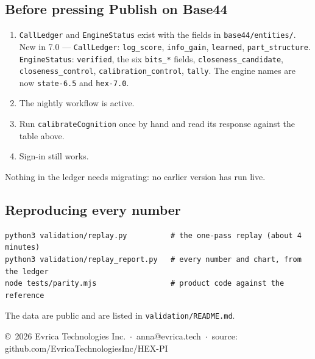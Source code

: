 \documentclass[10.5pt]{article}
\begin{document}
\subsection*{Before pressing Publish on Base44}
\begin{enumerate}[leftmargin=1.4em,itemsep=1pt]
\item \texttt{CallLedger} and \texttt{EngineStatus} exist with the fields in \texttt{base44/entities/}. New in 7.0 --- \texttt{CallLedger}: \texttt{log\_score}, \texttt{info\_gain}, \texttt{learned}, \texttt{part\_structure}. \texttt{EngineStatus}: \texttt{verified}, the six \texttt{bits\_*} fields, \texttt{closeness\_candidate}, \texttt{closeness\_control}, \texttt{calibration\_control}, \texttt{tally}. The engine names are now \texttt{state-6.5} and \texttt{hex-7.0}.
\item The nightly workflow is active.
\item Run \texttt{calibrateCognition} once by hand and read its response against the table above.
\item Sign-in still works.
\end{enumerate}
Nothing in the ledger needs migrating: no earlier version has run live.
\subsection*{Reproducing every number}
\begin{verbatim}
python3 validation/replay.py          # the one-pass replay (about 4 minutes)
python3 validation/replay_report.py   # every number and chart, from the ledger
node tests/parity.mjs                 # product code against the reference
\end{verbatim}
The data are public and are listed in \texttt{validation/README.md}.

\vfill
{\footnotesize\color{rule} \copyright\ 2026 Evrica Technologies Inc. \,$\cdot$\, anna@evrica.tech \,$\cdot$\, source: github.com/EvricaTechnologiesInc/HEX-PI}
\end{document}
